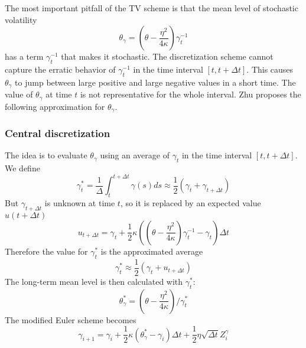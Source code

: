 \documentclass[12pt]{article}
\numberwithin{equation}{section}
\begin{document}
The most important pitfall of the TV scheme is that the mean level of stochastic volatility
\begin{equation}
\theta_\gamma = \left( \theta - \frac{\eta^2}{4\kappa} \right) \gamma_t^{-1}
\end{equation}
has a term $\gamma_t^{-1}$ that makes it stochastic. The discretization scheme cannot capture the erratic behavior of $\gamma_t^{-1}$ in the time interval $[t, t + \Delta t]$. This causes $\theta_\gamma$ to jump between large positive and large negative values in a short time. The value of $\theta_\gamma$ at time $t$ is not representative for the whole interval. Zhu proposes the following approximation for $\theta_\gamma$.
\subsubsection*{Central discretization}
The idea is to evaluate $\theta_\gamma$ using an average of $\gamma_t$ in the time interval $[t, t + \Delta t]$. We define
\begin{equation*}
\gamma^*_t = \frac{1}{\Delta} \int_{t}^{t+\Delta t} \gamma(s)ds \approx \frac{1}{2}(\gamma_t + \gamma_{t+\Delta t})
\end{equation*}
But $\gamma_{t+\Delta t}$ is unknown at time $t$, so it is replaced by an expected value $u(t+\Delta t)$
\begin{equation*}
u_{t+\Delta t} = \gamma_t + \frac{1}{2}\kappa \left( \left( \theta - \frac{\eta^2}{4\kappa} \right) \gamma_t^{-1} - \gamma_t \right) \Delta t
\end{equation*}
Therefore the value for $\gamma^*_t$ is the approximated average
\begin{equation}
\gamma^*_t \approx \frac{1}{2}(\gamma_t + u_{t+\Delta t})
\end{equation}
The long-term mean level is then calculated with $\gamma^*_t$:
\begin{equation}
\theta^*_\gamma =  \left( \theta - \frac{\eta^2}{4\kappa} \right) \Big/ \gamma^*_t
\end{equation}
The modified Euler scheme becomes
\begin{equation}
\gamma_{i+1} = \gamma_{i} + \frac{1}{2}\kappa(\theta^*_\gamma - \gamma_{i})\Delta t + \frac{1}{2}\eta\sqrt{\Delta t}Z_i^\gamma
\end{equation}
\end{document}
